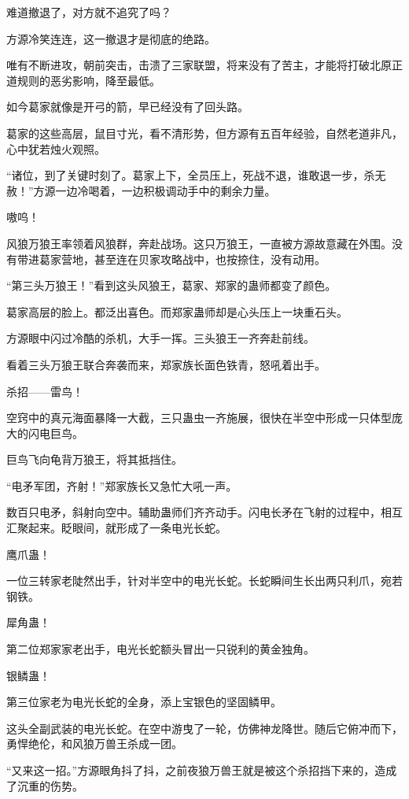 \begin{this_body}
难道撤退了，对方就不追究了吗？

方源冷笑连连，这一撤退才是彻底的绝路。

唯有不断进攻，朝前突击，击溃了三家联盟，将来没有了苦主，才能将打破北原正道规则的恶劣影响，降至最低。

如今葛家就像是开弓的箭，早已经没有了回头路。

葛家的这些高层，鼠目寸光，看不清形势，但方源有五百年经验，自然老道非凡，心中犹若烛火观照。

“诸位，到了关键时刻了。葛家上下，全员压上，死战不退，谁敢退一步，杀无赦！”方源一边冷喝着，一边积极调动手中的剩余力量。

嗷呜！

风狼万狼王率领着风狼群，奔赴战场。这只万狼王，一直被方源故意藏在外围。没有带进葛家营地，甚至连在贝家攻略战中，也按捺住，没有动用。

“第三头万狼王！”看到这头风狼王，葛家、郑家的蛊师都变了颜色。

葛家高层的脸上。都泛出喜色。而郑家蛊师却是心头压上一块重石头。

方源眼中闪过冷酷的杀机，大手一挥。三头狼王一齐奔赴前线。

看着三头万狼王联合奔袭而来，郑家族长面色铁青，怒吼着出手。

杀招——雷鸟！

空窍中的真元海面暴降一大截，三只蛊虫一齐施展，很快在半空中形成一只体型庞大的闪电巨鸟。

巨鸟飞向龟背万狼王，将其抵挡住。

“电矛军团，齐射！”郑家族长又急忙大吼一声。

数百只电矛，斜射向空中。辅助蛊师们齐齐动手。闪电长矛在飞射的过程中，相互汇聚起来。眨眼间，就形成了一条电光长蛇。

鹰爪蛊！

一位三转家老陡然出手，针对半空中的电光长蛇。长蛇瞬间生长出两只利爪，宛若钢铁。

犀角蛊！

第二位郑家家老出手，电光长蛇额头冒出一只锐利的黄金独角。

银鳞蛊！

第三位家老为电光长蛇的全身，添上宝银色的坚固鳞甲。

这头全副武装的电光长蛇。在空中游曳了一轮，仿佛神龙降世。随后它俯冲而下，勇悍绝伦，和风狼万兽王杀成一团。

“又来这一招。”方源眼角抖了抖，之前夜狼万兽王就是被这个杀招挡下来的，造成了沉重的伤势。


\end{this_body}
